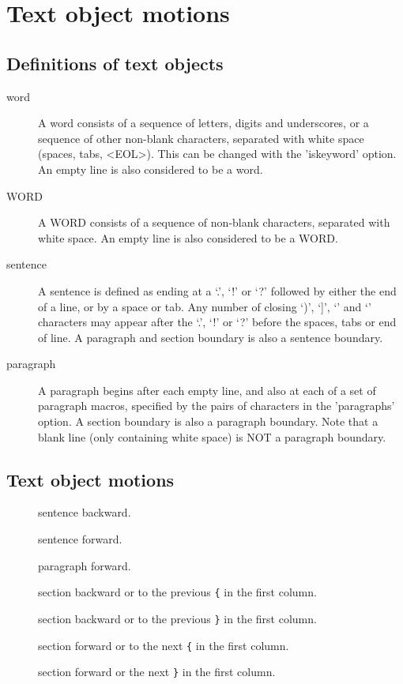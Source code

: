 \section{Text object motions}
\subsection{Definitions of text objects}
\begin{description}
  \item[word] A word consists of a sequence of letters, digits and underscores, or a sequence of other non-blank characters, separated with white space (spaces, tabs, <EOL>).  This can be changed with the 'iskeyword' option.  An empty line is also considered to be a word.
  \item[WORD] A WORD consists of a sequence of non-blank characters, separated with white space.  An empty line is also considered to be a WORD.
  \item[sentence] A sentence is defined as ending at a `.', `!' or `?' followed by either the end of a line, or by a space or tab.  Any number of closing `)', `]', `' and `' characters may appear after the `.', `!' or `?' before the spaces, tabs or end of line.  A paragraph and section boundary is also a sentence boundary.
  \item[paragraph] A paragraph begins after each empty line, and also at each of a set of paragraph macros, specified by the pairs of characters in the 'paragraphs' option. A section boundary is also a paragraph boundary. Note that a blank line (only containing white space) is NOT a paragraph boundary.
\end{description}
\subsection{Text object motions}
\begin{description}
  \item[\PVerb{(}] sentence backward.
  \item[\PVerb{)}] sentence forward.
  \item[\PVerb{{}] paragraph backward.
  \item[\PVerb{}}] paragraph forward.
  \item[\PVerb{[[}] section backward or to the previous \verb|{| in the first column.
  \item[\PVerb{[]}] section backward or to the previous \verb|}| in the first column.
  \item[\PVerb{]]}] section forward or to the next \verb|{| in the first column.
  \item[\PVerb{][}] section forward or the next \verb|}| in the first column.
\end{description}

